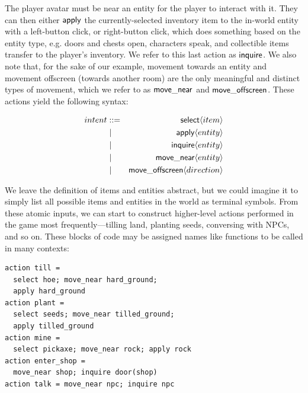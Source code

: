 The player avatar must be near an entity for the player to interact with
it. They can then either $\mathsf{apply}$ the currently-selected inventory
item to the in-world entity with a left-button click, or right-button
click, which does something based on the entity type, e.g. doors and chests
open, characters speak, and collectible items transfer to the player's
inventory. We refer to this last action as $\mathsf{inquire}$. We also note
that, for the sake of our example, movement towards an entity and movement
offscreen (towards another room) are the only meaningful and distinct types
of movement, which we refer to as $\mathsf{move\_near}$ and
$\mathsf{move\_offscreen}$. These actions yield the following syntax:

\begin{eqnarray*}
intent &::=& \mathsf{select} \langle item \rangle\\
       &\mid& \mathsf{apply} \langle entity \rangle\\
       &\mid& \mathsf{inquire} \langle entity \rangle\\
       &\mid& \mathsf{move\_near} \langle entity \rangle\\
       &\mid& \mathsf{move\_offscreen} \langle direction \rangle
\end{eqnarray*}

We leave the definition of items and entities abstract, but we could
imagine it to simply list all possible items and entities in the world as
terminal symbols.  
%
From these atomic inputs, we can start to construct higher-level actions
performed in the game most frequently---tilling land, planting seeds,
conversing with NPCs, and so on. These blocks of code may be assigned names
like functions to be called in many contexts:

% 

\begin{verbatim}
action till = 
  select hoe; move_near hard_ground; 
  apply hard_ground
action plant = 
  select seeds; move_near tilled_ground; 
  apply tilled_ground
action mine = 
  select pickaxe; move_near rock; apply rock
action enter_shop = 
  move_near shop; inquire door(shop)
action talk = move_near npc; inquire npc
\end{verbatim}

